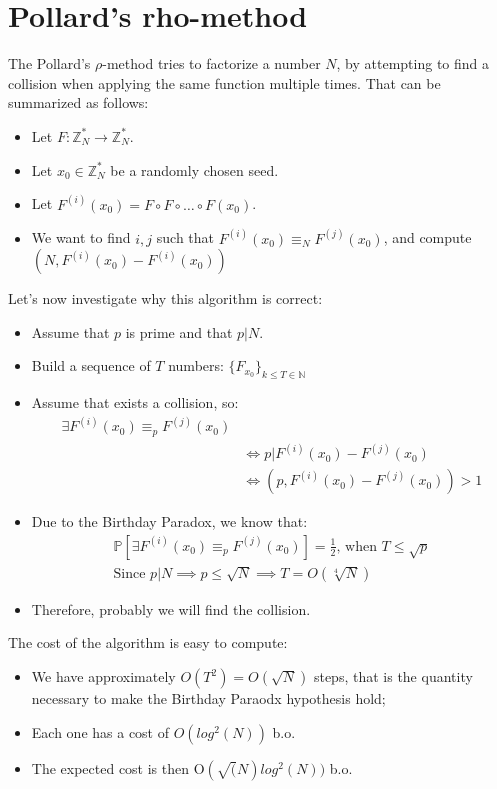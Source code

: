 \section{Pollard's rho-method}
The Pollard's $\rho$-method tries to factorize a number $N$, by attempting to find a collision when applying the same function multiple times. That can be summarized as follows:
\begin{itemize}
    \item Let $F: \mathbb{Z}_{N}^{*} \rightarrow \mathbb{Z}_{N}^{*}$.
    \item Let $x_{0} \in \mathbb{Z}_{N}^{*}$ be a randomly chosen seed.
    \item Let $F^{(i)}(x_{0}) = F \circ F \circ \dots \circ F(x_{0})$.
    \item We want to find $i,j$ such that $F^{(i)}(x_{0}) \equiv_{N} F^{(j)}(x_{0})$, and compute $(N, F^{(i)}(x_{0}) - F^{(i)}(x_{0}))$
\end{itemize}
Let's now investigate why this algorithm is correct:
\begin{itemize}
    \item Assume that $p$ is prime and that $p|N$.
    \item Build a sequence of $T$ numbers: $\{F_{x_{0}}\}_{k \leq T \in \mathbb{N}}$
    \item Assume that exists a collision, so:
    \begin{align*}
        \exists F^{(i)}(x_{0}) \equiv_{p} F^{(j)}(x_{0}) & \\
        & \iff p | F^{(i)}(x_{0}) - F^{(j)}(x_{0}) \\
        & \iff (p, F^{(i)}(x_{0}) - F^{(j)}(x_{0})) > 1
    \end{align*}
    \item Due to the Birthday Paradox, we know that:
    \begin{align*}
        \mathbb{P}[\exists F^{(i)}(x_{0}) \equiv_{p} F^{(j)}(x_{0})] = \frac{1}{2} \text{, when } T \leq \sqrt{p} \\
        \text{Since } p|N \implies p \leq \sqrt{N} \implies T = O(\sqrt[4]{N})
    \end{align*}
    \item Therefore, probably we will find the collision.
\end{itemize}
The cost of the algorithm is easy to compute:
\begin{itemize}
    \item We have approximately $O(T^{2}) = O(\sqrt{N})$ steps, that is the quantity necessary to make the Birthday Paraodx hypothesis hold;
    \item Each one has a cost of $O(log^{2}(N))$ b.o.
    \item The expected cost is then O$(\sqrt(N) log^{2}(N))$ b.o.
\end{itemize}

